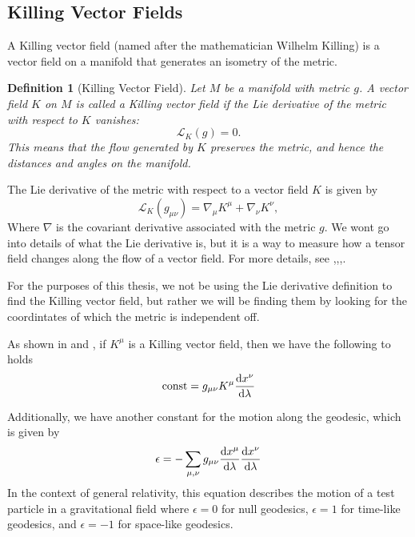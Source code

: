 \documentclass[12pt]{article}
\newtheorem{definition}{Definition}[section]
\begin{document}
\subsection{Killing Vector Fields}
A Killing vector field (named after the mathematician Wilhelm Killing) is a vector field on a manifold that generates an isometry of the metric.

\begin{definition}[Killing Vector Field]
	Let \(M\) be a manifold with metric \(g\). A vector field \(K\) on \(M\) is called a \emph{Killing vector field} if the Lie derivative of the metric with respect to \(K\) vanishes:
	\[
		\mathcal{L}_{K} (g) = 0.
	\]
	This means that the flow generated by \(K\) preserves the metric, and hence the distances and angles on the manifold.
\end{definition}
The Lie derivative of the metric with respect to a vector field \(K\) is given by
\[
	\mathcal{L}_{K} (g_{\mu\nu}) = \nabla_{\mu} K^{\mu} + \nabla_{\nu} K^{\nu},
\]
Where \(\nabla\) is the covariant derivative associated with the metric \(g\).
We wont go into details of what the Lie derivative is, but it is a way to measure how a tensor field changes along the flow of a vector field.
For more details, see \cite{oprea2007differential},\cite{note32020covariant},\cite{atkins2018solving},\cite{carrol2019spacetime}.

For the purposes of this thesis, we not be using the Lie derivative definition to find the Killing vector field, but rather we will be finding them by looking for the coordintates of which the metric is independent off.

As shown in \cite{carrol2019spacetime} and \cite{atkins2018solving}, if $K^{\mu}$ is a Killing vector field, then we have the following to holds
\begin{equation}\label{eq:Killing_vector}
	\text{const} = g_{\mu\nu}K^{\mu}\dv{x^{\nu}}{\lambda} 
\end{equation}

Additionally, we have another constant for the motion along the geodesic, which is given by
\begin{equation}\label{eq:epsilon_equation}
	\epsilon = - \sum_{\mu,\nu} g_{\mu\nu}\dv{x^{\mu}}{\lambda}\dv{x^{\nu}}{\lambda}
\end{equation}
In the context of general relativity, this equation describes the motion of a test particle in a gravitational field where \(\epsilon = 0\) for null geodesics, \(\epsilon = 1\) for time-like geodesics, and \(\epsilon = -1\) for space-like geodesics.
\end{document}
